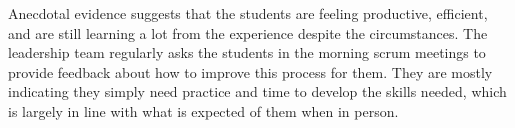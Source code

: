 Anecdotal evidence suggests that the students are feeling productive, efficient, and are still learning a lot from the experience despite the circumstances. The leadership team regularly asks the students in the morning scrum meetings to provide feedback about how to improve this process for them. They are mostly indicating they simply need practice and time to develop the skills needed, which is largely in line with what is expected of them when in person.
